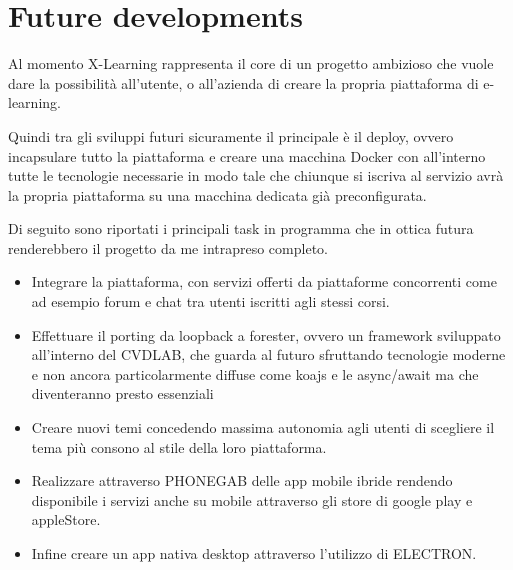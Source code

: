 \section{Future developments}
\label{sec:future_developments}
 
Al momento X-Learning rappresenta il core di un progetto ambizioso che vuole dare la possibilità all'utente, o all'azienda di creare la propria piattaforma di e-learning.

Quindi tra gli sviluppi futuri sicuramente il principale è il deploy, ovvero incapsulare tutto la piattaforma e creare una macchina Docker con all'interno tutte le tecnologie necessarie in modo tale che chiunque si iscriva al servizio avrà la propria piattaforma su una macchina dedicata già preconfigurata.

Di seguito sono riportati i principali task in programma che in ottica futura renderebbero il progetto da me intrapreso completo.

\begin{itemize}
  \item Integrare la piattaforma, con servizi offerti da piattaforme concorrenti come ad esempio forum e chat tra utenti iscritti agli stessi corsi.

  \item Effettuare il porting da loopback a forester, ovvero un framework sviluppato all'interno del CVDLAB, che guarda al futuro sfruttando tecnologie moderne e non ancora particolarmente diffuse come koajs e le async/await ma che diventeranno presto essenziali 

  \item Creare nuovi temi concedendo massima autonomia agli utenti di scegliere il tema più consono al stile della loro piattaforma.

  \item Realizzare attraverso PHONEGAB delle app mobile ibride rendendo disponibile i servizi anche su mobile attraverso gli store di google play e appleStore.

  \item Infine creare un app nativa desktop attraverso l'utilizzo di ELECTRON.

\end{itemize}